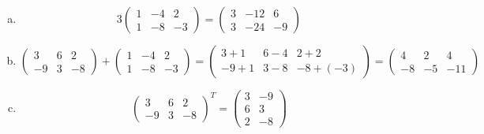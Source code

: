 \documentclass[11pt,letterpaper]{article}
\begin{document}
\sol 
\begin{enumerate}[(a)]
\item 
	\[
	3 \begin{pmatrix} 1 & -4 & 2 \\ 1 & -8 & -3 \end{pmatrix}= \begin{pmatrix} 3 & -12 & 6 \\ 3 & -24 & -9 \end{pmatrix}
	\]

\item 
	\[
	\begin{pmatrix} 3 & 6 & 2 \\ -9 & 3 & -8 \end{pmatrix} + \begin{pmatrix} 1 & -4 & 2 \\ 1 & -8 & -3 \end{pmatrix}= \begin{pmatrix} 3 + 1 & 6 - 4 & 2 + 2 \\ -9 + 1 & 3 - 8 & -8 + (-3) \end{pmatrix}= \begin{pmatrix} 4 & 2 & 4 \\ -8 & -5 & -11 \end{pmatrix}
	\]

\item 
	\[
	\begin{pmatrix} 3 & 6 & 2 \\ -9 & 3 & -8 \end{pmatrix}^T= \begin{pmatrix} 3 & -9 \\ 6 & 3 \\ 2 & -8 \end{pmatrix}
	\]


\end{enumerate}
\end{document}
